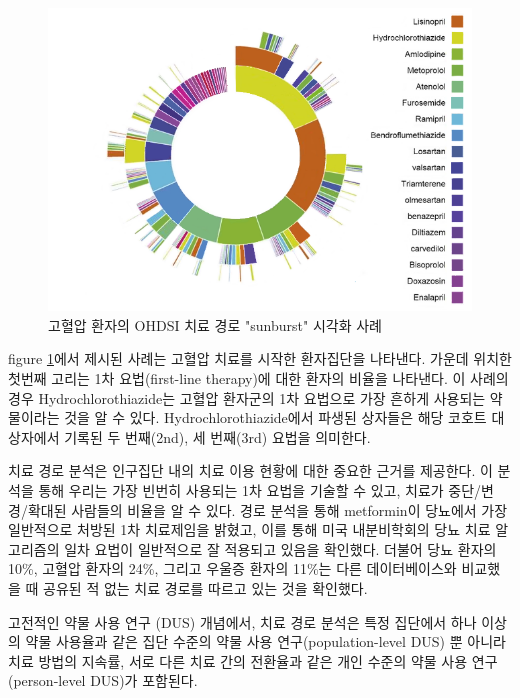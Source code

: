 \documentclass[11pt]{book}
\theoremstyle{definition}
\theoremstyle{definition}
\theoremstyle{definition}
\theoremstyle{remark}
\begin{document}
\begin{figure}

{\centering \includegraphics[width=1\linewidth]{images/Characterization/pnasTreatmentPathwaysSunburst} 

}

\caption{고혈압 환자의 OHDSI 치료 경로 "sunburst" 시각화 사례}\label{fig:treatmentPathwaysSunburstDataViz}
\end{figure}

figure \ref{fig:treatmentPathwaysSunburstDataViz}에서 제시된 사례는
고혈압 치료를 시작한 환자집단을 나타낸다. 가운데 위치한 첫번째 고리는
1차 요법(first-line therapy)에 대한 환자의 비율을 나타낸다. 이 사례의
경우 Hydrochlorothiazide는 고혈압 환자군의 1차 요법으로 가장 흔하게
사용되는 약물이라는 것을 알 수 있다. Hydrochlorothiazide에서 파생된
상자들은 해당 코호트 대상자에서 기록된 두 번째(2nd), 세 번째(3rd) 요법을
의미한다.

치료 경로 분석은 인구집단 내의 치료 이용 현황에 대한 중요한 근거를
제공한다. 이 분석을 통해 우리는 가장 빈번히 사용되는 1차 요법을 기술할
수 있고, 치료가 중단/변경/확대된 사람들의 비율을 알 수 있다. 경로 분석을
통해 metformin이 당뇨에서 가장 일반적으로 처방된 1차 치료제임을 밝혔고,
이를 통해 미국 내분비학회의 당뇨 치료 알고리즘의 일차 요법이 일반적으로
잘 적용되고 있음을 확인했다. 더불어 당뇨 환자의 10\%, 고혈압 환자의
24\%, 그리고 우울증 환자의 11\%는 다른 데이터베이스와 비교했을 때 공유된
적 없는 치료 경로를 따르고 있는 것을 확인했다.

고전적인 약물 사용 연구 (DUS) 개념에서, 치료 경로 분석은 특정 집단에서
하나 이상의 약물 사용율과 같은 집단 수준의 약물 사용
연구(population-level DUS) 뿐 아니라 치료 방법의 지속률, 서로 다른 치료
간의 전환율과 같은 개인 수준의 약물 사용 연구(person-level DUS)가
포함된다.
\end{document}
